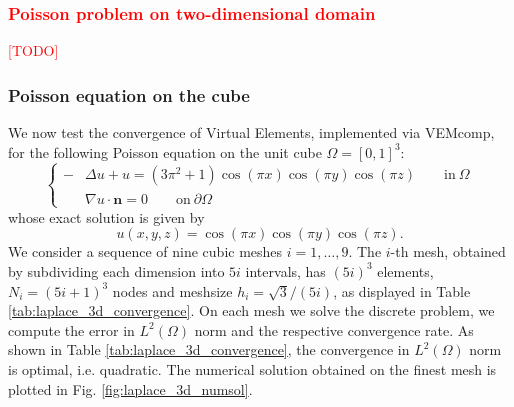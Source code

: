 \documentclass[a4paper]{article}
\newcommand{\red}[1]{\textcolor{red}{#1}}
\begin{document}
\subsubsection{\red{Poisson problem on two-dimensional domain}}
\label{sec:laplace_twodim}
\red{[TODO]}

\subsubsection{Poisson equation on the cube}
\label{sec:laplace_cube}
We now test the convergence of Virtual Elements, implemented via VEMcomp,  for the following  Poisson equation on the unit cube $\Omega = [0,1]^3$:
\begin{equation}
\label{experiment_laplace_equation_3d}
\begin{cases}
-&\Delta u + u = (3\pi^2+1)\cos(\pi x)\cos(\pi y)\cos(\pi z) \qquad \text{in}\ \Omega\\
&\nabla u \cdot \boldsymbol{n} = 0 \qquad \text{on}\ \partial \Omega
\end{cases}
\end{equation}
whose exact solution  is given by
\begin{equation}
u(x,y,z) = \cos(\pi x)\cos(\pi y)\cos(\pi z).
\end{equation}
We consider a sequence of nine cubic meshes $i=1,\dots,9$. The $i$-th mesh, obtained by subdividing each dimension into $5i$ intervals,  has $(5i)^3$ elements, $N_i = (5i+1)^3$ nodes and meshsize $h_i = \sqrt{3}/(5i)$, as displayed in Table \ref{tab:laplace_3d_convergence}. On each mesh we solve the discrete problem,  we compute the error in $L^2(\Omega)$ norm and the respective convergence rate. As shown in Table \ref{tab:laplace_3d_convergence}, the convergence in $L^2(\Omega)$ norm is optimal, i.e. quadratic. The numerical solution obtained on the finest mesh is plotted in Fig.  \ref{fig:laplace_3d_numsol}.
\end{document}
